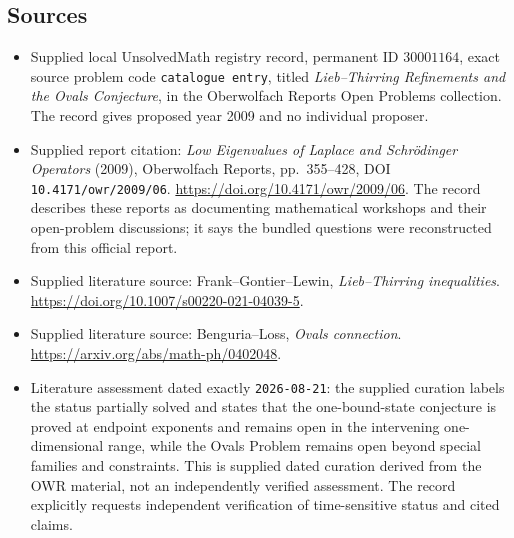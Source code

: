 \documentclass[11pt]{article}
\begin{document}
\subsection{Sources}
\begin{itemize}
\item Supplied local UnsolvedMath registry record, permanent ID \(30001164\), exact source problem code \texttt{catalogue entry}, titled \emph{Lieb--Thirring Refinements and the Ovals Conjecture}, in the Oberwolfach Reports Open Problems collection. The record gives proposed year 2009 and no individual proposer.
\item Supplied report citation: \emph{Low Eigenvalues of Laplace and Schr\"odinger Operators} (2009), Oberwolfach Reports, pp.\ 355--428, DOI \texttt{10.4171/owr/2009/06}. \url{https://doi.org/10.4171/owr/2009/06}. The record describes these reports as documenting mathematical workshops and their open-problem discussions; it says the bundled questions were reconstructed from this official report.
\item Supplied literature source: Frank--Gontier--Lewin, \emph{Lieb--Thirring inequalities}. \url{https://doi.org/10.1007/s00220-021-04039-5}.
\item Supplied literature source: Benguria--Loss, \emph{Ovals connection}. \url{https://arxiv.org/abs/math-ph/0402048}.
\item Literature assessment dated exactly \texttt{2026-08-21}: the supplied curation labels the status partially solved and states that the one-bound-state conjecture is proved at endpoint exponents and remains open in the intervening one-dimensional range, while the Ovals Problem remains open beyond special families and constraints. This is supplied dated curation derived from the OWR material, not an independently verified assessment. The record explicitly requests independent verification of time-sensitive status and cited claims.
\end{itemize}
\end{document}
